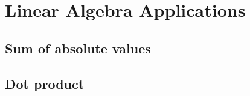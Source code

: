 \section{Linear Algebra Applications}

  \subsection{Sum of absolute values}

  \subsection{Dot product}

  

